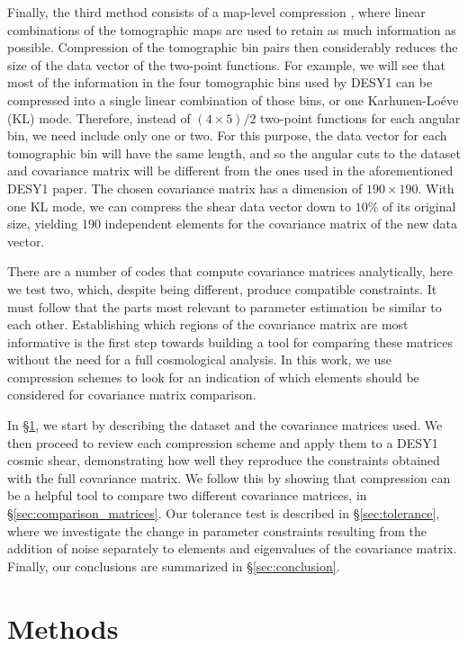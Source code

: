 \documentclass[aps, prd, twocolumn, superscriptaddress, nofootinbib, amssymb, amsmath]{revtex4-2}
\newcommand{\rsec}[1]{\S\ref{sec:#1}}
\begin{document}
Finally, the third method consists of a map-level compression \cite{Alonso:2017hhj}, where linear combinations of the tomographic maps are used to retain as much information as possible. Compression of the tomographic bin pairs then considerably reduces the size of the data vector of the two-point functions. For example, we will see that most of the information in the four tomographic bins used by DESY1 can be compressed into a single linear combination of those bins, or one Karhunen-Lo\'eve (KL) mode. Therefore, instead of $(4\times5)/2$ two-point functions for each angular bin, we need include only one or two. For this purpose, the data vector for each tomographic bin will have the same length, and so the angular cuts to the dataset and covariance matrix will be different from the ones used in the aforementioned DESY1 paper. The chosen covariance matrix has a dimension of $190 \times 190$. With one KL mode, we can compress the shear data vector down to $10\%$ of its original size, yielding 190 independent elements for the covariance matrix of the new data vector.

There are a number of codes that compute covariance matrices analytically, here we test two, which, despite being different, produce compatible constraints. It must follow that the parts most relevant to parameter estimation be similar to each other. Establishing which regions of the covariance matrix are most informative is the first step towards building a tool for comparing these matrices without the need for a full cosmological analysis. In this work, we use compression schemes to look for an indication of which elements should be considered for covariance matrix comparison.

In \rsec{methods}, we start by describing the dataset and the covariance matrices used. We then proceed to review each compression scheme and apply them to a DESY1 cosmic shear, demonstrating how well they reproduce the constraints obtained with the full covariance matrix. We follow this by showing that compression can be a helpful tool to compare two different covariance matrices, in \rsec{comparison_matrices}. Our tolerance test is described in \rsec{tolerance}, where we investigate the change in parameter constraints resulting from the addition of noise separately to elements and eigenvalues of the covariance matrix. Finally, our conclusions are summarized in \rsec{conclusion}. 

\section{Methods}
\label{sec:methods}
\end{document}
